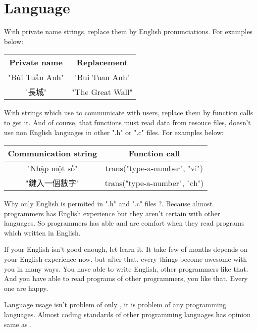 \chapter{Language}

\begin{crules}
\end{crules}

With private name strings, replace them by English pronunciations.
For examples below:
\begin{center}
    \begin{tabular}{c|c}
            Private name & Replacement \\
            \hline
            "Bùi Tuấn Anh" & "Bui Tuan Anh" \\
            "長城" & "The Great Wall" \\
    \end{tabular}
\end{center}

With strings which use to communicate with users, replace them by function
calls to get it. And of course, that functions must read data from resouce
files, doesn't use non English languages in other ".h" or ".c" files.
For examples below:
\begin{center}
    \begin{tabular}{c|c}
            Communication string & Function call \\
            \hline
            "Nhập một số" & trans("type-a-number", "vi") \\
            "鍵入一個數字" & trans("type-a-number", "ch") \\
    \end{tabular}
\end{center}

Why only English is permited in ".h" and ".c" files ?. Because almost
programmers has English experience but they aren't certain with other
languages. So programmers has able and are comfort when they read
programs which written in English.

If your English isn't good enough, let learn it. It take few of months
depends on your English experience now, but after that, every things
become awesome with you in many ways. You have able to write English,
other programmers like that. And you have able to read programs of other
programmers, you like that. Every one are happy.

Language usage isn't problem of only \clang{}, it is problem of any programming
languages. Almost coding standards of other programming languages has
opinion same as \pkgname{}.
